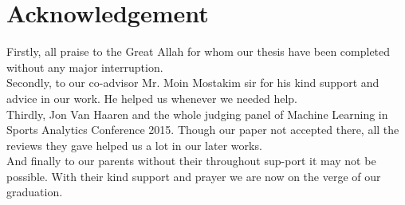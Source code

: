 \section*{Acknowledgement}
Firstly, all praise to the Great Allah for whom our thesis have been completed without any major interruption.\\
Secondly, to our co-advisor Mr. Moin Mostakim sir for his kind support and advice in our work. He helped us whenever we needed help.\\
Thirdly, Jon Van Haaren and the whole judging panel of Machine Learning in Sports Analytics Conference 2015. Though our paper not accepted there, all the reviews they gave helped us a lot in our later works.\\
And finally to our parents without their throughout sup-port it may not be possible. With their kind support and prayer we are now on the verge of our graduation.